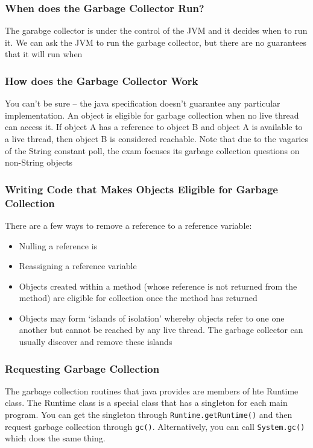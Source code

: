 \subsubsection{When does the Garbage Collector Run?}
The garabge collector is under the control of the JVM and it decides when to 
run it. We can ask the JVM to run the garbage collector, but there are no 
guarantees that it will run when 

\subsubsection{How does the Garbage Collector Work}
You can't be sure -- the java specification doesn't guarantee any particular 
implementation. An object is eligible for garbage collection when no live 
thread can access it. If object A has a reference to object B and object A is 
available to a live thread, then object B is considered reachable. Note that 
due to the vagaries of the String constant poll, the exam focuses its garbage 
collection questions on non-String objects

\subsubsection{Writing Code that Makes Objects Eligible for Garbage Collection}
There are a few ways to remove a reference to a reference variable:
\begin{itemize}
    \item Nulling a reference is
    \item Reassigning a reference variable
    \item Objects created within a method (whose reference is not returned from 
    the method) are eligible for collection once the method has returned
    \item Objects may form `islands of isolation' whereby objects refer to one 
    one another but cannot be reached by any live thread. The garbage collector 
    can usually discover and remove these islands
\end{itemize}

\subsubsection{Requesting Garbage Collection}
The garbage collection routines that java provides are members of hte Runtime 
class. The Runtime class is a special class that has a singleton for each main 
program. You can get the singleton through \verb#Runtime.getRuntime()# and then 
request garbage collection through \verb#gc()#. Alternatively, you can call 
\verb#System.gc()# which does the same thing. 

